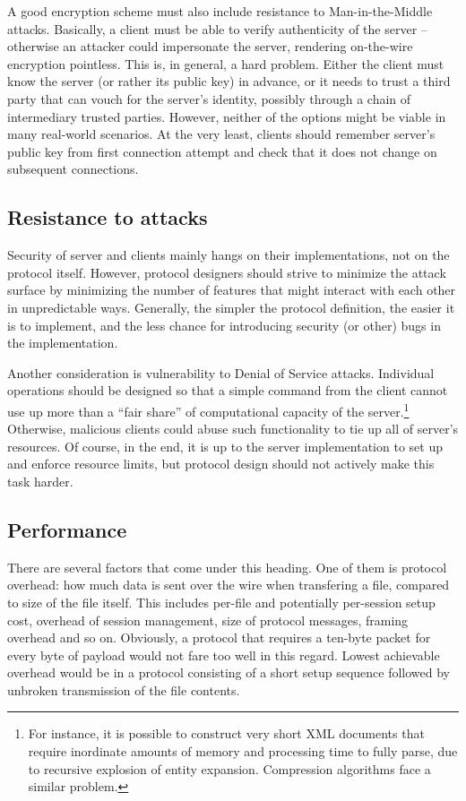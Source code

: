 A good encryption scheme must also include resistance to Man-in-the-Middle attacks. Basically, a client must
be able to verify authenticity of the server -- otherwise an attacker could impersonate the server, rendering
on-the-wire encryption pointless. This is, in general, a hard problem. Either the client must know the server
(or rather its public key) in advance, or it needs to trust a third party that can vouch for the server's
identity, possibly through a chain of intermediary trusted parties. However, neither of the options might be
viable in many real-world scenarios. At the very least, clients should remember server's public key from first
connection attempt and check that it does not change on subsequent connections.

\subsection{Resistance to attacks}

Security of server and clients mainly hangs on their implementations, not on the protocol itself. However,
protocol designers should strive to minimize the attack surface by minimizing the number of features that
might interact with each other in unpredictable ways. Generally, the simpler the protocol definition, the
easier it is to implement, and the less chance for introducing security (or other) bugs in the implementation.

Another consideration is vulnerability to Denial of Service attacks. Individual operations should be designed
so that a simple command from the client cannot use up more than a ``fair share'' of computational capacity of
the server.\footnote{For instance, it is possible to construct very short XML documents that require
inordinate amounts of memory and processing time to fully parse, due to recursive explosion of entity
expansion. Compression algorithms face a similar problem.} Otherwise, malicious clients could abuse such
functionality to tie up all of server's resources. Of course, in the end, it is up to the server
implementation to set up and enforce resource limits, but protocol design should not actively make this task
harder.

\subsection{Performance}

There are several factors that come under this heading. One of them is protocol overhead: how much data is
sent over the wire when transfering a file, compared to size of the file itself.  This includes per-file and
potentially per-session setup cost, overhead of session management, size of protocol messages, framing
overhead and so on. Obviously, a protocol that requires a ten-byte packet for every byte of payload would not
fare too well in this regard. Lowest achievable overhead would be in a protocol consisting of a short setup
sequence followed by unbroken transmission of the file contents.

